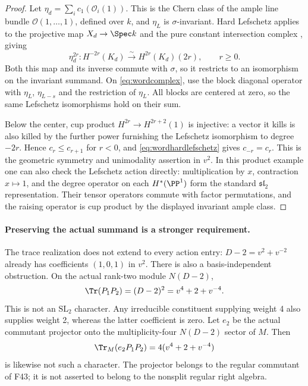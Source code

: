 \documentclass[11pt,a4paper]{article}
\newcommand{\fid}[1]{\textsf{#1}}\newcommand{\gate}[1]{\textsf{#1}}
\theoremstyle{named}\newtheorem{finding}{Finding}[section]
\theoremstyle{definition}\newtheorem{definition}[finding]{Definition}
\theoremstyle{remark}\newtheorem{remark}[finding]{Remark}
\begin{document}
\begin{proof}
Let $\eta_d=\sum_i c_1(\mathcal O_i(1))$.
This is the Chern class of the ample line bundle
$\mathcal O(1,\ldots,1)$, defined over $k$, and $\eta_L$ is
$\sigma$-invariant. Hard Lefschetz applies to the projective
map $X_d\to\Spec k$ and the pure constant intersection complex
\cite[Theorem~5.4.10, p.~144]{BBD}, giving
\begin{equation}\label{eq:wordhardlefschetz}
 \eta_d^{2r}:H^{-2r}(K_d)
          \xrightarrow{\sim} H^{2r}(K_d)(2r),\qquad r\ge0.
\end{equation}
Both this map and its inverse commute with $\sigma$, so it
restricts to an isomorphism on the invariant summand. On
\eqref{eq:wordcomplex}, use the block diagonal operator with
$\eta_L$, $\eta_{L-s}$ and the restriction of $\eta_L$.
All blocks are centered at zero, so the same Lefschetz
isomorphisms hold on their sum.

Below the center, cup product
$H^{2r}\to H^{2r+2}(1)$ is injective: a vector it kills is
also killed by the further power furnishing the Lefschetz
isomorphism to degree $-2r$. Hence $c_r\le c_{r+1}$ for $r<0$,
and \eqref{eq:wordhardlefschetz} gives $c_{-r}=c_r$.
This is the geometric symmetry and unimodality assertion in $v^2$.
In this product example one can also check the Lefschetz action
directly: multiplication by $x$, contraction $x\mapsto1$, and
the degree operator on each $H^*(\PP^1)$ form the standard
$\mathfrak{sl}_2$ representation. Their tensor operators commute
with factor permutations, and the raising operator is cup product
by the displayed invariant ample class.
\end{proof}

\paragraph{Preserving the actual summand is a stronger requirement.}
The trace realization does not extend to every action entry:
$D-2=v^2+v^{-2}$ already has coefficients $(1,0,1)$ in $v^2$.
There is also a basis-independent obstruction. On the actual
rank-two module $N(D-2)$,
\[
 \Tr(P_1P_2)=(D-2)^2=v^4+2+v^{-4}.
\]
This is not an $\mathrm{SL}_2$ character. Any irreducible
constituent supplying weight 4 also supplies weight 2, whereas
the latter coefficient is zero.
Let $e_2$ be the actual commutant projector onto the
multiplicity-four $N(D-2)$ sector of $M$. Then
\[
 \Tr_M(e_2P_1P_2)=4(v^4+2+v^{-4})
\]
is likewise not such a character. The projector belongs to the
regular commutant of \fid{F43}; it is not asserted to belong to
the nonsplit regular right algebra.
\end{document}
